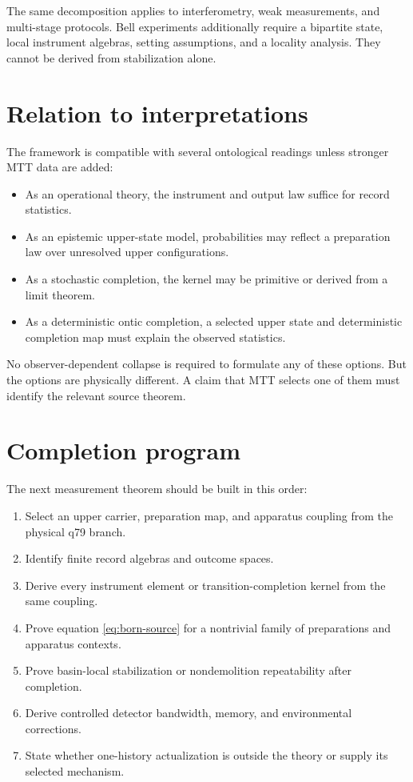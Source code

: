 \documentclass[11pt,a4paper]{article}
\theoremstyle{definition}
\theoremstyle{remark}
\begin{document}
The same decomposition applies to interferometry, weak measurements, and
multi-stage protocols. Bell experiments additionally require a bipartite state,
local instrument algebras, setting assumptions, and a locality analysis. They
cannot be derived from stabilization alone.

\section{Relation to interpretations}

The framework is compatible with several ontological readings unless stronger
MTT data are added:
\begin{itemize}
\item As an operational theory, the instrument and output law suffice for
record statistics.
\item As an epistemic upper-state model, probabilities may reflect a
preparation law over unresolved upper configurations.
\item As a stochastic completion, the kernel may be primitive or derived from
a limit theorem.
\item As a deterministic ontic completion, a selected upper state and
deterministic completion map must explain the observed statistics.
\end{itemize}

No observer-dependent collapse is required to formulate any of these options.
But the options are physically different. A claim that MTT selects one of
them must identify the relevant source theorem.

\section{Completion program}

The next measurement theorem should be built in this order:
\begin{enumerate}
\item Select an upper carrier, preparation map, and apparatus coupling from
the physical q79 branch.
\item Identify finite record algebras and outcome spaces.
\item Derive every instrument element or transition-completion kernel from
the same coupling.
\item Prove equation \eqref{eq:born-source} for a nontrivial family of
preparations and apparatus contexts.
\item Prove basin-local stabilization or nondemolition repeatability after
completion.
\item Derive controlled detector bandwidth, memory, and environmental
corrections.
\item State whether one-history actualization is outside the theory or supply
its selected mechanism.
\end{enumerate}
\end{document}
